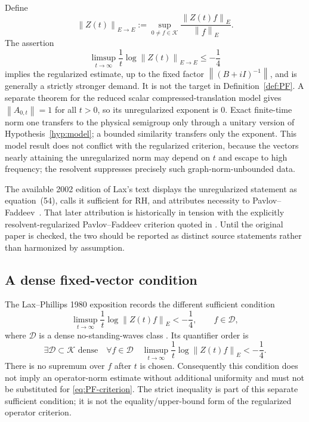 \documentclass[11pt]{amsart}
\theoremstyle{definition}
\theoremstyle{remark}
\newcommand{\Kcal}{\mathcal K}
\newcommand{\Dcal}{\mathcal D}
\newcommand{\norm}[1]{\left\lVert #1\right\rVert}
\begin{document}
Define
\[
 \norm{Z(t)}_{E\to E}
 :=\sup_{0\neq f\in\Kcal}
 \frac{\norm{Z(t)f}_{E}}{\norm{f}_{E}}.
\]
The assertion
\begin{equation}\label{eq:unregularized}
 \limsup_{t\to\infty}\frac1t\log\norm{Z(t)}_{E\to E}
 \leq-\frac14
\end{equation}
implies the regularized estimate, up to the fixed factor
$\norm{(B+iI)^{-1}}$, and is generally a strictly stronger demand.  It is not
the target in Definition~\ref{def:PF}.  A separate theorem for the reduced
scalar compressed-translation model gives $\norm{A_{0,t}}=1$ for all $t>0$,
so its unregularized exponent is $0$.  Exact finite-time norm one transfers to
the physical semigroup only through a unitary version of
Hypothesis~\ref{hyp:model}; a bounded similarity transfers only the exponent.
This model result does not conflict with the regularized criterion, because
the vectors nearly attaining the unregularized norm may depend on $t$ and
escape to high frequency; the resolvent suppresses precisely such
graph-norm-unbounded data.

The available 2002 edition of Lax's text displays the unregularized statement
as equation~(54), calls it sufficient for RH, and attributes necessity to
Pavlov--Faddeev~\cite{Lax2002}.  That later attribution is historically in
tension with the explicitly resolvent-regularized Pavlov--Faddeev criterion
quoted in \cite{TakhtajanEtAl2017}.  Until the original paper is checked, the
two should be reported as distinct source statements rather than harmonized by
assumption.

\subsection{A dense fixed-vector condition}

The Lax--Phillips 1980 exposition records the different sufficient condition
\begin{equation}\label{eq:dense-vector}
 \limsup_{t\to\infty}\frac1t\log\norm{Z(t)f}_{E}
 <-\frac14,
 \qquad f\in\Dcal,
\end{equation}
where $\Dcal$ is a dense no-standing-waves class
\cite[\S6, formula (6.19)]{LaxPhillips1980}.  Its quantifier order is
\[
 \exists\Dcal\subset\Kcal\text{ dense}\quad
 \forall f\in\Dcal\quad
 \limsup_{t\to\infty}\frac1t\log\norm{Z(t)f}_{E}<-\frac14.
\]
There is no supremum over $f$ after $t$ is chosen.  Consequently this condition
does not imply an operator-norm estimate without additional uniformity and
must not be substituted for \eqref{eq:PF-criterion}.  The strict inequality is
part of this separate sufficient condition; it is not the equality/upper-bound
form of the regularized operator criterion.
\end{document}

